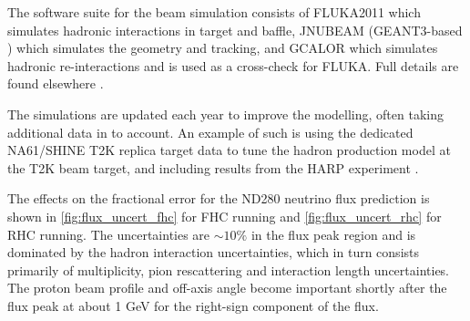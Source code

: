 The software suite for the beam simulation consists of FLUKA2011 \cite{fluka2008_1, fluka2008_2, fluka2011} which simulates hadronic interactions in target and baffle, JNUBEAM (GEANT3-based \cite{geant3}) which simulates the geometry and tracking, and GCALOR \cite{gcalor} which simulates hadronic re-interactions and is used as a cross-check for FLUKA. Full details are found elsewhere \cite{t2k_beam, t2k_tn_flux}.

The simulations are updated each year to improve the modelling, often taking additional data in to account. An example of such is using the dedicated NA61/SHINE T2K replica target data \cite{NA61_pions_rep} to tune the hadron production model at the T2K beam target, and including results from the HARP experiment \cite{harp}.

The effects on the fractional error for the ND280 neutrino flux prediction is shown in \autoref{fig:flux_uncert_fhc} for FHC running and \autoref{fig:flux_uncert_rhc} for RHC running. The uncertainties are $\sim10\%$ in the flux peak region and is dominated by the hadron interaction uncertainties, which in turn consists primarily of multiplicity, pion rescattering and interaction length uncertainties. The proton beam profile and off-axis angle become important shortly after the flux peak at about 1 GeV for the right-sign component of the flux.

